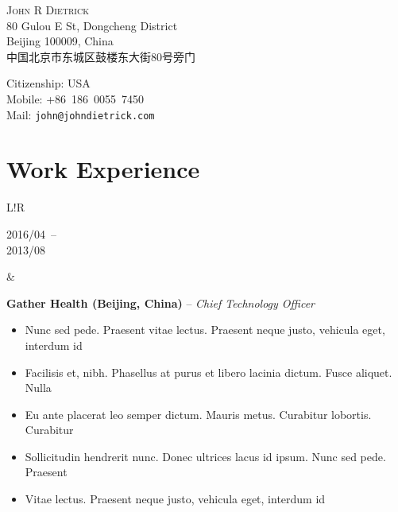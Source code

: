 \documentclass[10pt]{article}
\newcommand\VRule{\color{lightgray}\vrule width 0.5pt}
\begin{document}
\begin{CJK}{UTF8}{gbsn}

\def\fullName{John R Dietrick}
\def\englishAddressLineOne{80 Gulou E St, Dongcheng District}
\def\englishAddressLineTwo{Beijing 100009, China}
\def\chineseAddress{中国北京市东城区鼓楼东大街80号旁门}
\def\citizenship{USA}
\def\mobileNumber{+86~186~0055~7450}
\def\emailAddress{john@johndietrick.com}

\vspace{0pt}
\begin{center}
    \flushleft
    \begin{minipage}[b]{0.45\linewidth}
        \vspace{0pt}
        {\huge\textsc{\fullName}}\\
        \englishAddressLineOne\\
        \englishAddressLineTwo
        \ifx\USAVERSION\undefined
            \\\chineseAddress
        \fi
    \end{minipage}
    \begin{minipage}[b]{0.45\linewidth}
        \vspace{0pt}
        Citizenship: \citizenship\\
        Mobile: \mobileNumber\\
        Mail: \texttt{\emailAddress}
    \end{minipage}
\end{center}

\vspace{-6pt}

\section*{Work Experience}
\begin{tabular}{L!{\VRule}R}
    \parbox[t]{1.0\linewidth}{
        {\scriptsize 2016/04}~--\\
        {\scriptsize 2013/08}
    }&
    \parbox[t]{1.0\linewidth}{
        {\bf Gather Health (Beijing, China)} -- \textit{Chief Technology Officer}\\
        \vspace{-8pt}
        \begin{itemize}[leftmargin=16pt]
            \item Nunc sed pede. Praesent vitae lectus. Praesent neque justo, vehicula eget, interdum id
            \item Facilisis et, nibh. Phasellus at purus et libero lacinia dictum. Fusce aliquet. Nulla
            \item Eu ante placerat leo semper dictum. Mauris metus. Curabitur lobortis. Curabitur
            \item Sollicitudin hendrerit nunc. Donec ultrices lacus id ipsum. Nunc sed pede. Praesent
            \item Vitae lectus. Praesent neque justo, vehicula eget, interdum id
        \end{itemize}
    }\\


\end{tabular}
\end{CJK}
\end{document}
